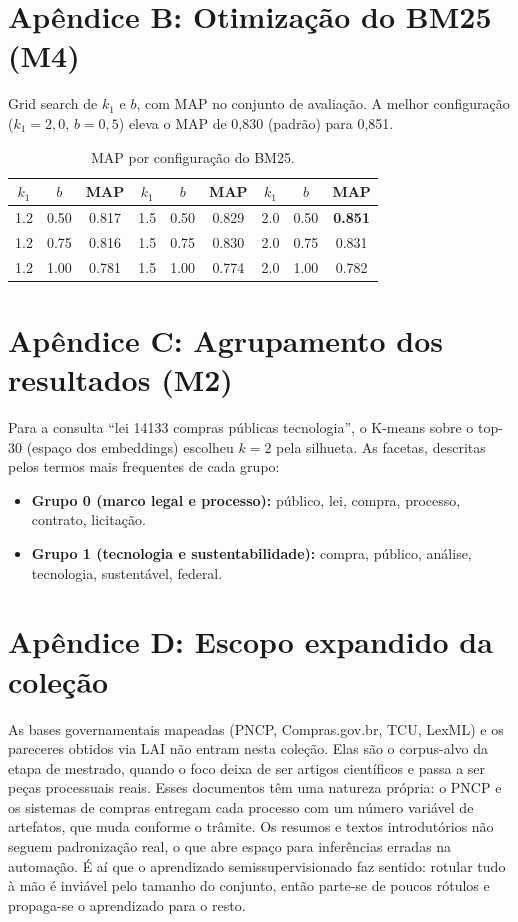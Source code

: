 \documentclass[12pt]{article}
\begin{document}
\section*{Apêndice B: Otimização do BM25 (M4)}

Grid search de $k_1$ e $b$, com MAP no conjunto de avaliação. A melhor configuração ($k_1=2{,}0$, $b=0{,}5$) eleva o MAP de 0,830 (padrão) para 0,851.

\begin{table}[h]
\centering
\small
\caption{MAP por configuração do BM25.}
\begin{tabular}{ccc|ccc|ccc}
\toprule
$k_1$ & $b$ & MAP & $k_1$ & $b$ & MAP & $k_1$ & $b$ & MAP \\
\midrule
1.2 & 0.50 & 0.817 & 1.5 & 0.50 & 0.829 & 2.0 & 0.50 & \textbf{0.851} \\
1.2 & 0.75 & 0.816 & 1.5 & 0.75 & 0.830 & 2.0 & 0.75 & 0.831 \\
1.2 & 1.00 & 0.781 & 1.5 & 1.00 & 0.774 & 2.0 & 1.00 & 0.782 \\
\bottomrule
\end{tabular}
\end{table}

\section*{Apêndice C: Agrupamento dos resultados (M2)}

Para a consulta ``lei 14133 compras públicas tecnologia'', o K-means sobre o top-30 (espaço dos embeddings) escolheu $k=2$ pela silhueta. As facetas, descritas pelos termos mais frequentes de cada grupo:

\begin{itemize}
    \item \textbf{Grupo 0 (marco legal e processo):} público, lei, compra, processo, contrato, licitação.
    \item \textbf{Grupo 1 (tecnologia e sustentabilidade):} compra, público, análise, tecnologia, sustentável, federal.
\end{itemize}

\section*{Apêndice D: Escopo expandido da coleção}

As bases governamentais mapeadas (PNCP, Compras.gov.br, TCU, LexML) e os pareceres obtidos via LAI não entram nesta coleção. Elas são o corpus-alvo da etapa de mestrado, quando o foco deixa de ser artigos científicos e passa a ser peças processuais reais. Esses documentos têm uma natureza própria: o PNCP e os sistemas de compras entregam cada processo com um número variável de artefatos, que muda conforme o trâmite. Os resumos e textos introdutórios não seguem padronização real, o que abre espaço para inferências erradas na automação. É aí que o aprendizado semissupervisionado faz sentido: rotular tudo à mão é inviável pelo tamanho do conjunto, então parte-se de poucos rótulos e propaga-se o aprendizado para o resto.
\end{document}
